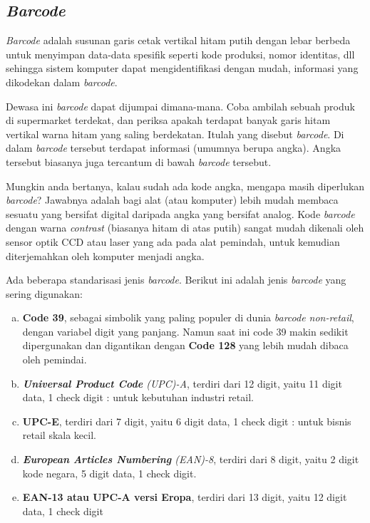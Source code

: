 \documentclass{jtetiproposalskripsi}
\begin{document}
\subsection{\emph{Barcode}}
\emph{Barcode} adalah susunan garis cetak vertikal hitam putih dengan lebar berbeda untuk menyimpan data-data spesifik seperti kode produksi, nomor identitas, dll sehingga sistem komputer dapat mengidentifikasi dengan mudah, informasi yang dikodekan dalam \emph{barcode}.

Dewasa ini \emph{barcode} dapat dijumpai dimana-mana. Coba ambilah sebuah produk di supermarket terdekat, dan periksa apakah terdapat banyak garis hitam vertikal warna hitam yang saling berdekatan. Itulah yang disebut \emph{barcode}. Di dalam \emph{barcode} tersebut terdapat informasi (umumnya berupa angka). Angka tersebut biasanya juga tercantum di bawah \emph{barcode} tersebut.

Mungkin anda bertanya, kalau sudah ada kode angka, mengapa masih diperlukan \emph{barcode}? Jawabnya adalah bagi alat (atau komputer) lebih mudah membaca sesuatu yang bersifat digital daripada angka yang bersifat analog. Kode \emph{barcode} dengan warna \emph{contrast} (biasanya hitam di atas putih) sangat mudah dikenali oleh sensor optik CCD atau laser yang ada pada alat pemindah, untuk kemudian diterjemahkan oleh komputer menjadi angka.

Ada beberapa standarisasi jenis \emph{barcode}. Berikut ini adalah jenis \emph{barcode} yang sering digunakan:
\begin{enumerate}[a.]
\itemsep0em
\item \textbf{Code 39}, sebagai simbolik yang paling populer di dunia \emph{barcode non-retail}, dengan variabel digit yang panjang. Namun saat ini code 39 makin sedikit dipergunakan dan digantikan dengan \textbf{Code 128} yang lebih mudah dibaca oleh pemindai.
\item \emph{\textbf{Universal Product Code} (UPC)-A}, terdiri dari 12 digit, yaitu 11 digit data, 1 check digit : untuk kebutuhan industri retail.
\item \textbf{UPC-E}, terdiri dari 7 digit, yaitu 6 digit data, 1 check digit : untuk bisnis retail skala kecil.
\item \emph{\textbf{European Articles Numbering} (EAN)-8}, terdiri dari 8 digit, yaitu 2 digit kode negara, 5 digit data, 1 check digit.
\item \textbf{EAN-13 atau UPC-A versi Eropa}, terdiri dari 13 digit, yaitu 12 digit data, 1 check digit
\end{enumerate}
\end{document}
